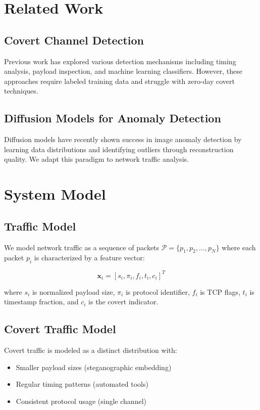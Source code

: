 \documentclass[sigconf]{acmart}
\begin{document}
\section{Related Work}

\subsection{Covert Channel Detection}

Previous work has explored various detection mechanisms including timing analysis, payload inspection, and machine learning classifiers. However, these approaches require labeled training data and struggle with zero-day covert techniques.

\subsection{Diffusion Models for Anomaly Detection}

Diffusion models have recently shown success in image anomaly detection by learning data distributions and identifying outliers through reconstruction quality. We adapt this paradigm to network traffic analysis.

\section{System Model}

\subsection{Traffic Model}

We model network traffic as a sequence of packets $\mathcal{P} = \{p_1, p_2, \ldots, p_N\}$ where each packet $p_i$ is characterized by a feature vector:

\begin{equation}
\mathbf{x}_i = [s_i, \pi_i, f_i, t_i, c_i]^T
\end{equation}

where $s_i$ is normalized payload size, $\pi_i$ is protocol identifier, $f_i$ is TCP flags, $t_i$ is timestamp fraction, and $c_i$ is the covert indicator.

\subsection{Covert Traffic Model}

Covert traffic is modeled as a distinct distribution with:
\begin{itemize}
\item Smaller payload sizes (steganographic embedding)
\item Regular timing patterns (automated tools)
\item Consistent protocol usage (single channel)
\end{itemize}
\end{document}
